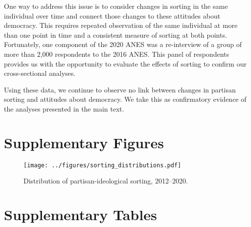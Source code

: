 \documentclass[10pt,landscape]{article}
\begin{document}
One way to address this issue is to consider changes in sorting in the same individual over time and connect those changes to these attitudes about democracy. 
This requires repeated observation of the same individual at more than one point in time and a consistent measure of sorting at both points.
Fortunately, one component of the 2020 ANES was a re-interview of a group of more than 2,000 respondents to the 2016 ANES.
This panel of respondents provides us with the opportunity to evaluate the effects of sorting to confirm our cross-sectional analyses.

Using these data, we continue to observe no link between changes in partisan sorting and attitudes about democracy. 
We take this as confirmatory evidence of the analyses presented in the main text.




\clearpage
\section{Supplementary Figures}

\begin{figure}[h]
    \centering
    \texttt{[image: ../figures/sorting\_distributions.pdf]}
    \caption{Distribution of partisan-ideological sorting, 2012--2020.}
    \label{fig:sorting_distribution}
\end{figure}

\clearpage
\section{Supplementary Tables}



\clearpage


\clearpage


\clearpage


\clearpage


\clearpage


\clearpage


\clearpage


\clearpage


\clearpage


\clearpage


\clearpage
\end{document}
